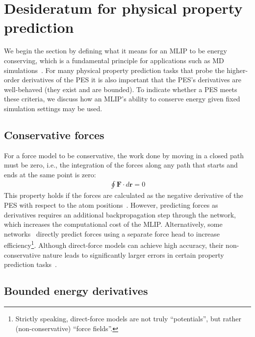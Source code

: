 \documentclass[twocolumn]{fairmeta}
\begin{document}
\section{Desideratum for physical property prediction}
\label{sec:conservation}

We begin the section by defining what it means for an MLIP to be energy conserving, which is a fundamental principle for applications such as MD simulations~\citep{tuckerman2023statistical}. For many physical property prediction tasks that probe the higher-order derivatives of the PES it is also important that the PES's derivatives are well-behaved (they exist and are bounded). To indicate whether a PES meets these criteria, we discuss how an MLIP's ability to conserve energy given fixed simulation settings may be used. 

\subsection{Conservative forces}
For a force model to be conservative, the work done by moving in a closed path must be zero, i.e., the integration of the forces along any path that starts and ends at the same point is zero:
\begin{align}
\oint \bm F \cdot d\bm r = 0
\end{align}
This property holds if the forces are calculated as the negative derivative of the PES with respect to the atom positions~\citep{unke2021machine}. However, predicting forces as derivatives requires an additional backpropagation step through the network, which increases the computational cost of the MLIP. Alternatively, some networks~\citep{liao2023equiformerv2, neumann2024orb} directly predict forces using a separate force head to increase efficiency\footnote{Strictly speaking, direct-force models are not truly ``potentials'', but rather (non-conservative) ``force fields''.}. Although direct-force models can achieve high accuracy, their non-conservative nature leads to significantly larger errors in certain property prediction tasks~\citep{fu2023forces, loew2024universal, pota2024thermal, bigi2024dark}.

\subsection{Bounded energy derivatives}
\end{document}
